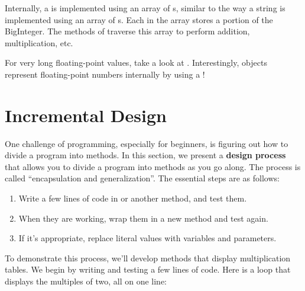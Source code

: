 Internally, a  is implemented using an array of s, similar to the way a string is implemented using an array of s.
Each  in the array stores a portion of the BigInteger.
The methods of  traverse this array to perform addition, multiplication, etc.

For very long floating-point values, take a look at .
Interestingly,  objects represent floating-point numbers internally by using a !



\section{Incremental Design}
\label{encapsulation}




One challenge of programming, especially for beginners, is figuring out how to divide a program into methods.
In this section, we present a {\bf design process} that allows you to divide a program into methods as you go along.
The process is called ``encapsulation and generalization''.
The essential steps are as follows:

\begin{enumerate}
\item Write a few lines of code in  or another method, and test them.
\item When they are working, wrap them in a new method and test again.
\item If it's appropriate, replace literal values with variables and parameters.
\end{enumerate}


To demonstrate this process, we'll develop methods that display multiplication tables.
We begin by writing and testing a few lines of code.
Here is a loop that displays the multiples of two, all on one line:

